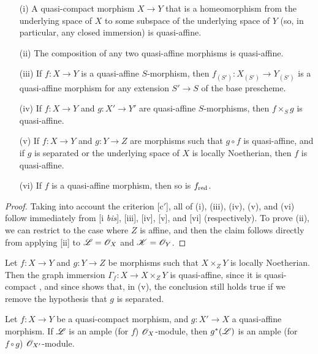 \begin{proposition}[5.1.10]
\label{II.5.1.10}
\medskip\noindent
\begin{enumerate}
  \item[{\rm(i)}] A quasi-compact morphism $X\to Y$ that is a homeomorphism from the underlying space of $X$ to some subspace of the underlying space of $Y$ (so, in particular, any closed immersion) is quasi-affine.
  \item[{\rm(ii)}] The composition of any two quasi-affine morphisms is quasi-affine.
  \item[{\rm(iii)}] If $f:X\to Y$ is a quasi-affine $S$-morphism, then $f_{(S')}:X_{(S')}\to Y_{(S')}$ is a quasi-affine morphism for any extension $S'\to S$ of the base prescheme.
  \item[{\rm(iv)}] If $f:X\to Y$ and $g:X'\to Y'$ are quasi-affine $S$-morphisms, then $f\times_S g$ is quasi-affine.
  \item[{\rm(v)}] If $f:X\to Y$ and $g:Y\to Z$ are morphisms such that $g\circ f$ is quasi-affine, and if $g$ is separated or the underlying space of $X$ is locally Noetherian, then $f$ is quasi-affine.
  \item[{\rm(vi)}] If $f$ is a quasi-affine morphism, then so is $f_{\mathrm{red}}$.
\end{enumerate}
\end{proposition}

\begin{proof}
Taking into account the criterion [c$'$], all of (i), (iii), (iv), (v), and (vi) follow immediately from [i \emph{bis}], [iii], [iv], [v], and [vi] (respectively).
To prove (ii), we can restrict to the case where $Z$ is affine, and then the claim follows directly from applying [ii] to $\mathscr{L}=\mathscr{O}_X$ and $\mathscr{K}=\mathscr{O}_Y$.
\end{proof}

\begin{remark}[5.1.11]
\label{II.5.1.11}
Let $f:X\to Y$ and $g:Y\to Z$ be morphisms such that $X\times_Z Y$ is locally Noetherian.
Then the graph immersion $\Gamma_f:X\to X\times_Z Y$ is quasi-affine, since it is quasi-compact , and since  shows that, in (v), the conclusion still holds true if we remove the hypothesis that $g$ is separated.
\end{remark}

\begin{proposition}[5.1.12]
\label{II.5.1.12}
Let $f:X\to Y$ be a quasi-compact morphism, and $g:X'\to X$ a quasi-affine morphism.
If $\mathscr{L}$ is an ample (for $f$) $\mathscr{O}_X$-module, then $g^*(\mathscr{L})$ is an ample (for $f\circ g$) $\mathscr{O}_{X'}$-module.
\end{proposition}

